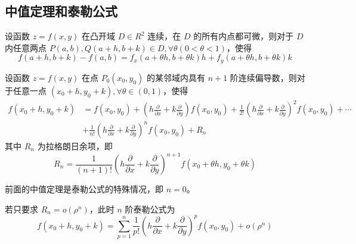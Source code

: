 \subsection{中值定理和泰勒公式}

\begin{theorem}[拉格朗日中值定理]
    设函数 $z=f(x,y)$ 在凸开域 $D\in R^2$ 连续，在 $D$ 的所有内点都可微，则对于 $D$ 内任意两点 $P(a,b),Q(a+h,b+k)\in D, \forall\theta(0<\theta<1)$，使得
    \[
        f(a+h,b+k)-f(a,b)=f_x(a+\theta h,b+\theta k)h+f_y(a+\theta h,b+\theta k)k
    \]
\end{theorem}

\begin{theorem}[泰勒公式]
    设函数 $z=f(x,y)$ 在点 $P_0(x_0,y_0)$ 的某邻域内具有 $n+1$ 阶连续偏导数，则对于任意一点 $(x_0+h,y_0+k),\forall \theta \in (0,1)$，使得
    \[
        \begin{aligned}
            f(x_0+h,y_0+k) & =f(x_0,y_0)+(h\frac{\partial}{\partial x}+k\frac{\partial}{\partial y})f(x_0,y_0)+\frac{1}{2!}(h\frac{\partial}{\partial x}+k\frac{\partial}{\partial y})^2f(x_0,y_0)+\cdots \\
                           & +\frac{1}{n!}(h\frac{\partial}{\partial x}+k\frac{\partial}{\partial y})^nf(x_0,y_0)+R_n
        \end{aligned}
    \]
    其中 $R_n$ 为拉格朗日余项，即
    \[
        R_n=\frac{1}{(n+1)!}(h\frac{\partial}{\partial x}+k\frac{\partial}{\partial y})^{n+1}f(x_0+\theta h,y_0+\theta k)
    \]
\end{theorem}

前面的中值定理是泰勒公式的特殊情况，即 $n=0$。

若只要求 $R_n=o(\rho^n)$，此时 $n$ 阶泰勒公式为
\[
    f(x_0+h,y_0+k)=\sum_{p=1}^n\frac{1}{p!}(h\frac{\partial}{\partial x}+k\frac{\partial}{\partial y})^pf(x_0,y_0)+o(\rho^n)
\]